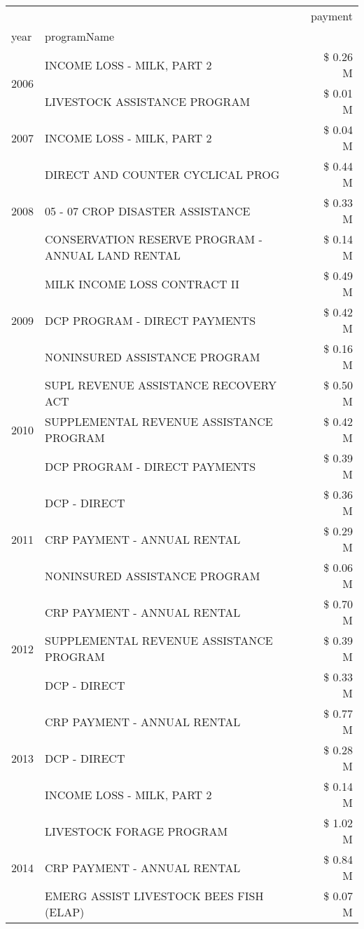 \begin{tabular}{llr}
\toprule
 &  & payment \\
year & programName &  \\
\midrule
\multirow[t]{2}{*}{2006} & INCOME LOSS - MILK, PART 2 & \$ 0.26 M \\
 & LIVESTOCK ASSISTANCE PROGRAM & \$ 0.01 M \\
\cline{1-3}
2007 & INCOME LOSS - MILK, PART 2 & \$ 0.04 M \\
\cline{1-3}
\multirow[t]{3}{*}{2008} & DIRECT AND COUNTER CYCLICAL PROG & \$ 0.44 M \\
 & 05 - 07 CROP DISASTER ASSISTANCE & \$ 0.33 M \\
 & CONSERVATION RESERVE PROGRAM - ANNUAL LAND RENTAL & \$ 0.14 M \\
\cline{1-3}
\multirow[t]{3}{*}{2009} & MILK INCOME LOSS CONTRACT II & \$ 0.49 M \\
 & DCP PROGRAM - DIRECT PAYMENTS & \$ 0.42 M \\
 & NONINSURED ASSISTANCE PROGRAM & \$ 0.16 M \\
\cline{1-3}
\multirow[t]{3}{*}{2010} & SUPL REVENUE ASSISTANCE RECOVERY ACT & \$ 0.50 M \\
 & SUPPLEMENTAL REVENUE ASSISTANCE PROGRAM & \$ 0.42 M \\
 & DCP PROGRAM - DIRECT PAYMENTS & \$ 0.39 M \\
\cline{1-3}
\multirow[t]{3}{*}{2011} & DCP - DIRECT & \$ 0.36 M \\
 & CRP PAYMENT - ANNUAL RENTAL & \$ 0.29 M \\
 & NONINSURED ASSISTANCE PROGRAM & \$ 0.06 M \\
\cline{1-3}
\multirow[t]{3}{*}{2012} & CRP PAYMENT - ANNUAL RENTAL & \$ 0.70 M \\
 & SUPPLEMENTAL REVENUE ASSISTANCE PROGRAM & \$ 0.39 M \\
 & DCP - DIRECT & \$ 0.33 M \\
\cline{1-3}
\multirow[t]{3}{*}{2013} & CRP PAYMENT - ANNUAL RENTAL & \$ 0.77 M \\
 & DCP - DIRECT & \$ 0.28 M \\
 & INCOME LOSS - MILK, PART 2 & \$ 0.14 M \\
\cline{1-3}
\multirow[t]{3}{*}{2014} & LIVESTOCK FORAGE PROGRAM & \$ 1.02 M \\
 & CRP PAYMENT - ANNUAL RENTAL & \$ 0.84 M \\
 & EMERG ASSIST LIVESTOCK BEES FISH (ELAP) & \$ 0.07 M \\
\cline{1-3}

\end{tabular}
